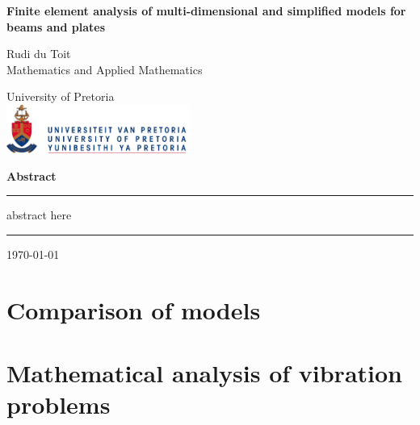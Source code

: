 \documentclass[12pt]{report}
\begin{document}
  \begin{titlepage}
    \centering
    \vspace*{0.3in} 
    \bgroup
    \Huge\bfseries Finite element analysis of multi-dimensional and simplified models for beams and plates \par
    \egroup
    \vspace{0.5in}
    \bgroup
    \Large Rudi du Toit\\[0.1in]
    \egroup
    Mathematics and Applied Mathematics \par
    \vspace{0.5in}
    \bgroup
    \Large University of Pretoria\\
    \vspace{0.2in}
    \includegraphics[width=6cm]{images/logo-up.jpg}
    \egroup
    \par
    \vspace{0.5in}
    {\LARGE\bfseries Abstract}
    \par
    \vspace{0.1in}
    \hrule
    \vspace{0.1in}
    \begin{minipage}{0.9\textwidth}
     abstract here
    \end{minipage}
    \vspace{0.1in}
    \hrule
    \vfill
    \today
  \end{titlepage}
\newpage

\newpage
\tableofcontents

\chapter{Comparison of models}







\chapter{Mathematical analysis of vibration problems}

\end{document}
